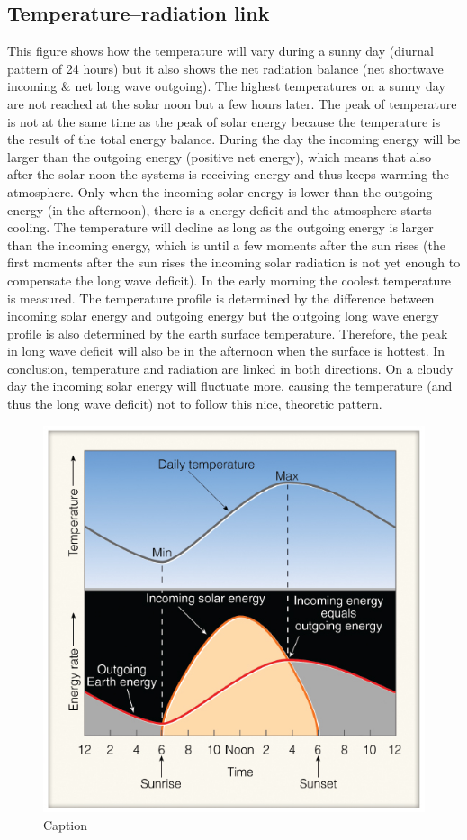 \documentclass[12pt,oneside]{book}
\begin{document}
\subsection{Temperature--radiation
link}\label{temperatureradiation-link}

This figure shows how the temperature will vary during a sunny day
(diurnal pattern of 24 hours) but it also shows the net radiation
balance (net shortwave incoming \& net long wave outgoing). The highest
temperatures on a sunny day are not reached at the solar noon but a few
hours later. The peak of temperature is not at the same time as the peak
of solar energy because the temperature is the result of the total
energy balance. During the day the incoming energy will be larger than
the outgoing energy (positive net energy), which means that also after
the solar noon the systems is receiving energy and thus keeps warming
the atmosphere. Only when the incoming solar energy is lower than the
outgoing energy (in the afternoon), there is a energy deficit and the
atmosphere starts cooling. The temperature will decline as long as the
outgoing energy is larger than the incoming energy, which is until a few
moments after the sun rises (the first moments after the sun rises the
incoming solar radiation is not yet enough to compensate the long wave
deficit). In the early morning the coolest temperature is measured. The
temperature profile is determined by the difference between incoming
solar energy and outgoing energy but the outgoing long wave energy
profile is also determined by the earth surface temperature. Therefore,
the peak in long wave deficit will also be in the afternoon when the
surface is hottest. In conclusion, temperature and radiation are linked
in both directions. On a cloudy day the incoming solar energy will
fluctuate more, causing the temperature (and thus the long wave deficit)
not to follow this nice, theoretic pattern.

\begin{figure}

{\centering \includegraphics[width=0.8\linewidth]{figures/Figure215} 

}

\caption{Caption}\label{fig:TempRad}
\end{figure}
\end{document}
